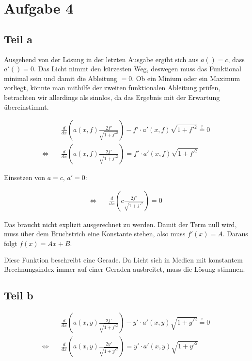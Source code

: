 \documentclass[a4paper,german,12pt,smallheadings]{scrartcl}
\begin{document}
\section*{Aufgabe 4}
\subsection*{Teil a}

Ausgehend von der Lösung in der letzten Ausgabe ergibt sich aus $a() = c$, dass
$a'() = 0$. Das Licht nimmt den kürzesten Weg, deswegen muss das Funktional
minimal sein und damit die Ableitung $=0$. Ob ein Minium oder ein Maximum
vorliegt, könnte man mithilfe der zweiten funktionalen Ableitung prüfen,
betrachten wir allerdings als sinnlos, da das Ergebnis mit der Erwartung
übereinstimmt.

\begin{align*}
  &\frac{d}{dx} \left(a(x,f) \frac{2f'}{\sqrt{1+f'^2}} \right) - f' \cdot a'(x, f) \sqrt{1+f'^2} \overset{!}{=} 0 \\
  \Leftrightarrow \quad &\frac{d}{dx} \left(a(x,f) \frac{2f'}{\sqrt{1+f'^2}} \right) = f' \cdot a'(x, f) \sqrt{1+f'^2}
\end{align*}

Einsetzen von $a = c$, $a' = 0$:

\begin{align*}
  \Leftrightarrow \quad &\frac{d}{dx} \left(c \frac{2f'}{\sqrt{1+f'^2}} \right) = 0
\end{align*}

Das braucht nicht explizit ausgerechnet zu werden. Damit der Term null wird,
muss über dem Bruchstrich eine Konstante stehen, also muss $f'(x) = A$. Daraus
folgt $f(x) = Ax+B$.

Diese Funktion beschreibt eine Gerade. Da Licht sich in Medien mit konstantem
Brechnungsindex immer auf einer Geraden ausbreitet, muss die Lösung stimmen.

\subsection*{Teil b}

\begin{align*}
  &\frac{d}{dx} \left(a(x,y) \frac{2f'}{\sqrt{1+f'^2}} \right) - y' \cdot a'(x, y) \sqrt{1+y'^2} \overset{!}{=} 0 \\
  \Leftrightarrow \quad &\frac{d}{dx} \left(a(x,y) \frac{2y'}{\sqrt{1+y'^2}} \right) = y' \cdot a'(x, y) \sqrt{1+y'^2}
\end{align*}
\end{document}
